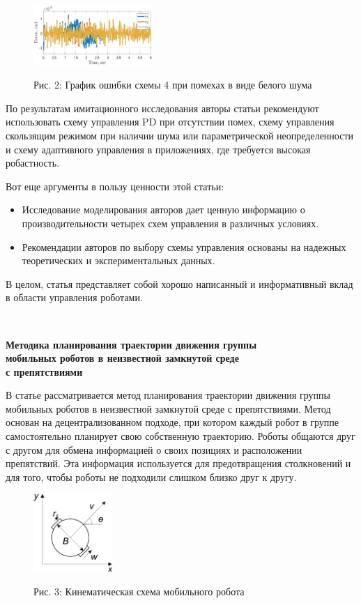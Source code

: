 \documentclass[russian,11pt]{article}
\providecommand{\header}[1]{
\,
\begin{center}
{\Large \textbf{#1}}
\end{center}
}
\begin{document}
\begin{figure}[!h]
\centering
\includegraphics[width=0.4\textwidth]{1_scheme4_noise}
\begin{center}{\footnotesize Рис. 2: График ошибки схемы 4 при помехах в виде белого шума}\end{center}
\end{figure}

По результатам имитационного исследования авторы статьи рекомендуют использовать схему управления PD при отсутствии помех, схему управления скользящим режимом при наличии шума или параметрической неопределенности и схему адаптивного управления в приложениях, где требуется высокая робастность.

Вот еще аргументы в пользу ценности этой статьи:
\begin{itemize}
\item Исследование моделирования авторов дает ценную информацию о производительности четырех схем управления в различных условиях.
\item Рекомендации авторов по выбору схемы управления основаны на надежных теоретических и экспериментальных данных.
\end{itemize}

В целом, статья представляет собой хорошо написанный и информативный вклад в области управления роботами.

\header{Методика планирования траектории движения
группы \\мобильных роботов в неизвестной замкнутой среде \\с препятствиями \cite{2}}

В статье рассматривается метод планирования траектории движения группы мобильных роботов в неизвестной замкнутой среде с препятствиями. Метод основан на децентрализованном подходе, при котором каждый робот в группе самостоятельно планирует свою собственную траекторию. Роботы общаются друг с другом для обмена информацией о своих позициях и расположении препятствий. Эта информация используется для предотвращения столкновений и для того, чтобы роботы не подходили слишком близко друг к другу.
\pagebreak
\begin{figure}[!h]
\centering
\includegraphics[width=0.27\textwidth]{2_robot}
\begin{center}{\footnotesize Рис. 3: Кинематическая схема мобильного робота}\end{center}
\end{figure}
\end{document}
